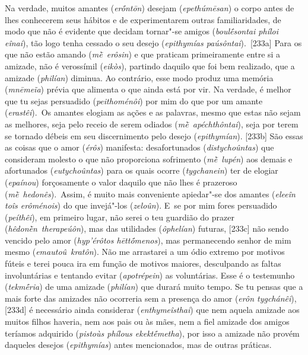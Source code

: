 Na verdade, muitos amantes (\emph{erṓntōn}) desejam (\emph{epethúmēsan})
o corpo antes de lhes conhecerem seus hábitos e de experimentarem outras
familiaridades, de modo que não é evidente que decidam tornar"-se amigos
(\emph{boulḗsontai phíloi eînai}), tão logo tenha cessado o seu desejo
(\emph{epithymías paúsôntai}).~[233a] Para os que não estão amando
(\emph{mḕ~erôsin}) e que praticam primeiramente entre si a amizade, não
é verossímil (\emph{eikòs}), partindo daquilo que foi bem realizado, que
a amizade (\emph{philían}) diminua. Ao contrário, esse modo produz uma
memória (\emph{mnēmeĩa}) prévia que alimenta o que ainda está por vir.
Na verdade, é melhor que tu sejas persuadido (\emph{peithoménôi}) por
mim do que por um amante (\emph{erastêi}).~Os amantes elogiam as ações e
as palavras, mesmo que estas não sejam as melhores, seja pelo receio de
serem odiados (\emph{mḕ~apéchthôntai}), seja por terem se tornado débeis
em seu discernimento pelo desejo (\emph{epithymían}). [233b] São
essas as coisas que o amor (\emph{érôs}) manifesta: desafortunados
(\emph{distychoûntas}) que consideram molesto o que não proporciona
sofrimento (\emph{mḕ}~\emph{lupén}) aos demais e afortunados
(\emph{eutychoûntas}) para os quais ocorre (\emph{tygchanein}) ter de
elogiar (\emph{epaínou}) forçosamente o valor daquilo que não lhes é
prazeroso (\emph{mḕ~hedonês}).~Assim, é muito mais conveniente
apiedar"-se dos amantes (\emph{eleeîn toîs erôménois}) do que invejá"-los
(\emph{zeloûn}). E~se por mim fores persuadido (\emph{peíthêi}), em
primeiro lugar, não serei o teu guardião do prazer
(\emph{hêdonḕn}~\emph{therapeúôn}), mas das utilidades (\emph{ôphelían})
futuras, [233c] não sendo vencido pelo amor (\emph{hyp'érôtos
hēttṓmenos}), mas permanecendo senhor de mim mesmo
(\emph{emautoû}~\emph{kratôn}). Não me arrastarei a um ódio extremo por
motivos fúteis e terei pouca ira em função de motivos maiores,
desculpando as faltas involuntárias e tentando evitar
(\emph{apotrépein}) as voluntárias. Esse é o testemunho
(\emph{tekmḗria}) de uma amizade (\emph{philían}) que durará muito
tempo. Se tu pensas que a mais forte das amizades não ocorreria sem a
presença do amor (\emph{erôn tygchánêi}), [233d] é necessário ainda
considerar (\emph{enthymeîsthai}) que nem aquela amizade aos muitos
filhos haveria, nem aos pais ou às mães, nem a fiel amizade dos amigos
teríamos adquirido (\emph{pistoùs phílous ekektḗmetha}), por isso a
amizade não provém daqueles desejos (\emph{epithymías}) antes
mencionados, mas de outras práticas.

